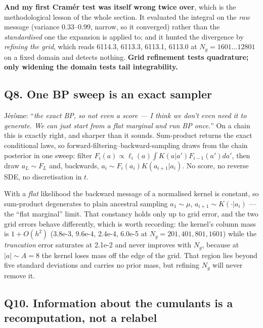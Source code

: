 \documentclass[10pt,a4paper]{article}
\newcommand{\nsites}{L}
\newcommand{\st}[1]{\textbf{#1}}
\begin{document}
\st{And my first Cramér test was itself wrong twice over}, which is the methodological lesson of
the whole section. It evaluated the integral on the \emph{raw} message (variance 0.33--0.99,
narrow, so it converged) rather than the \emph{standardised} one the expansion is applied to;
and it hunted the divergence by \emph{refining the grid}, which reads 6114.3, 6113.3, 6113.1,
6113.0 at $N_g = 1601\ldots12801$ on a fixed domain and detects nothing. \st{Grid refinement
tests quadrature; only widening the domain tests tail integrability.}

\subsection{Q8. One BP sweep is an exact sampler}

Jérôme: ``\emph{the exact BP, so not even a score --- I think we don't even need it to generate.
We can just start from a flat marginal and run BP once.}'' On a chain this is exactly right, and
sharper than it sounds. Sum-product returns the exact conditional laws, so
forward-filtering--backward-sampling draws from the chain posterior in one sweep: filter
$F_i(a) \propto \ell_i(a)\int K(a|a')F_{i-1}(a')da'$, then draw $a_\nsites\sim F_\nsites$ and,
backwards, $a_i \sim F_i(a_i)K(a_{i+1}|a_i)$. No score, no reverse SDE, no discretisation in $t$.

With a \emph{flat} likelihood the backward message of a normalised kernel is constant, so
sum-product degenerates to plain ancestral sampling $a_1\sim\mu$, $a_{i+1}\sim K(\cdot|a_i)$ ---
the ``flat marginal'' limit. That constancy holds only up to grid error, and the two grid errors
behave differently, which is worth recording: the kernel's column mass is $1+O(h^2)$
(3.8e-3, 9.6e-4, 2.4e-4, 6.0e-5 at $N_g = 201,401,801,1601$) while the \emph{truncation} error
saturates at 2.1e-2 and never improves with $N_g$, because at $|a|\sim A=8$ the kernel loses mass
off the edge of the grid. That region lies beyond five standard deviations and carries no prior
mass, but refining $N_g$ will never remove it.

\subsection{Q10. Information about the cumulants is a recomputation, not a relabel}
\end{document}

